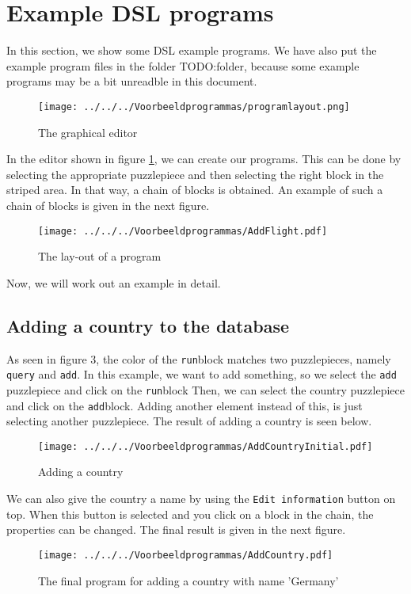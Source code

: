 \section{Example DSL programs}
In this section, we show some DSL example programs. We have also put the example program files in the folder TODO:folder, because some example programs may be a bit unreadble in this document.

\begin{figure}[H]
	\centering
	\texttt{[image: ../../../Voorbeeldprogrammas/programlayout.png]}
	\caption{The graphical editor}
	\label{ex:DSLlayout}
\end{figure}
\noindent In the editor shown in figure \ref{ex:DSLlayout}, we can create our programs. This can be done by selecting the appropriate puzzlepiece and then selecting the right block in the striped area. In that way, a chain of blocks is obtained. An example of such a chain of blocks is given in the next figure.
\begin{figure}[H]
	\centering
	\texttt{[image: ../../../Voorbeeldprogrammas/AddFlight.pdf]}
	\caption{The lay-out of a program}
	\label{ex:generalexample}
\end{figure}
Now, we will work out an example in detail.

\subsection{Adding a country to the database}
As seen in figure 3, the color of the \texttt{run}block matches two puzzlepieces, namely \texttt{query} and \texttt{add}.
In this example, we want to add something, so we select the \texttt{add} puzzlepiece and click on the \texttt{run}block Then, we can select the country puzzlepiece and click on the \texttt{add}block. Adding another element instead of this, is just selecting another puzzlepiece. The result of adding a country is seen below.
\begin{figure}[H]
	\centering
	\texttt{[image: ../../../Voorbeeldprogrammas/AddCountryInitial.pdf]}
	\caption{Adding a country}
	\label{ex:addCountryInitial}
\end{figure}
\noindent We can also give the country a name by using the \texttt{Edit information} button on top. When this button is selected and you click on a block in the chain, the properties can be changed. The final result is given in the next figure.
\begin{figure}[H]
	\centering
	\texttt{[image: ../../../Voorbeeldprogrammas/AddCountry.pdf]}
	\caption{The final program for adding a country with name 'Germany'}
	\label{ex:addCountry}
\end{figure}

